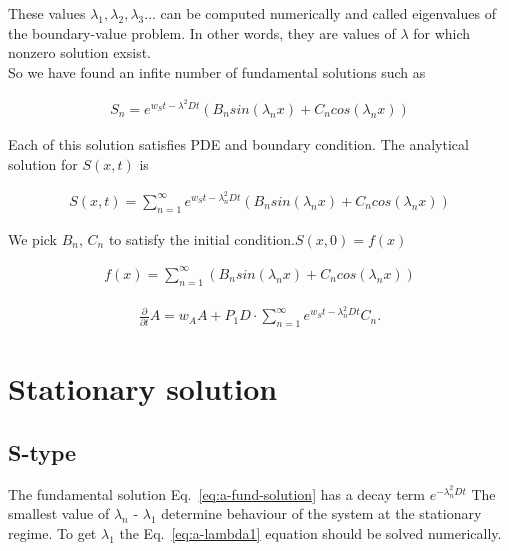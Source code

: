 \documentclass[10pt, oneside]{article}
\begin{document}
 These values $\lambda_1, \lambda_2, \lambda_3 ...$ can be computed numerically and called eigenvalues of the boundary-value problem. In other words, they are values of $\lambda$ for which nonzero solution exsist.
 \\
 So we have found an infite number of fundamental solutions such as 
 \begin{linenomath}
 	\begin{align} 
 	\label{eq:a-fund-solution}
 	S_n=e^{w_St-\lambda^2Dt}\left(B_nsin(\lambda_n x)+C_ncos(\lambda_n x )\right)
 	\end{align}
 \end{linenomath}
Each of this solution satisfies PDE and boundary condition.
The analytical solution for $S(x,t)$ is
\begin{linenomath}
	\begin{align} 
	S(x,t)=\sum_{n=1}^{\infty} e^{w_St-\lambda_n^2Dt}\left(B_nsin(\lambda_n x)+C_ncos(\lambda_n x )\right)
	\end{align}
\end{linenomath}

We pick $B_n$, $C_n$ to satisfy the initial condition.$S(x,0)=f(x)$
\begin{linenomath}
	\begin{align} 
	f(x)=\sum_{n=1}^{\infty}\left(B_nsin(\lambda_n x)+C_ncos(\lambda_n x )\right)
	\end{align}
\end{linenomath}

\begin{linenomath}
	\begin{align} 
	\label{eq:a-dyn}
	\frac{\partial}{\partial t} A = w_A A + P_1D \cdot\sum_{n=1}^{\infty} e^{w_St-\lambda_n^2Dt}C_n .
	\end{align}
\end{linenomath}
 
\section{Stationary solution}
\subsection{S-type}

The fundamental solution  Eq.~\eqref{eq:a-fund-solution} has a decay term $ e^{-\lambda_n^2Dt}$  The smallest value of $\lambda_n$ - $\lambda_1$ determine behaviour of the system at the stationary regime.
To get $\lambda_1$ the Eq.~\eqref{eq:a-lambda1} equation should be solved numerically. 
\end{document}
